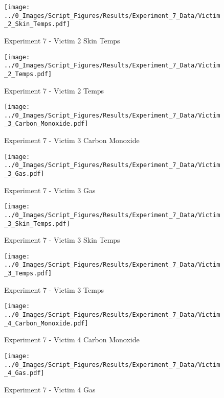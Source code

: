 	\clearpage

	\begin{figure}[H]
		\centering
		\texttt{[image: ../0\_Images/Script\_Figures/Results/Experiment\_7\_Data/Victim\_2\_Skin\_Temps.pdf]}
		\caption[]{Experiment 7 - Victim 2 Skin Temps}
	\end{figure}
 

	\begin{figure}[H]
		\centering
		\texttt{[image: ../0\_Images/Script\_Figures/Results/Experiment\_7\_Data/Victim\_2\_Temps.pdf]}
		\caption[]{Experiment 7 - Victim 2 Temps}
	\end{figure}
 
	\clearpage

	\begin{figure}[H]
		\centering
		\texttt{[image: ../0\_Images/Script\_Figures/Results/Experiment\_7\_Data/Victim\_3\_Carbon\_Monoxide.pdf]}
		\caption[]{Experiment 7 - Victim 3 Carbon Monoxide}
	\end{figure}
 

	\begin{figure}[H]
		\centering
		\texttt{[image: ../0\_Images/Script\_Figures/Results/Experiment\_7\_Data/Victim\_3\_Gas.pdf]}
		\caption[]{Experiment 7 - Victim 3 Gas}
	\end{figure}
 
	\clearpage

	\begin{figure}[H]
		\centering
		\texttt{[image: ../0\_Images/Script\_Figures/Results/Experiment\_7\_Data/Victim\_3\_Skin\_Temps.pdf]}
		\caption[]{Experiment 7 - Victim 3 Skin Temps}
	\end{figure}
 

	\begin{figure}[H]
		\centering
		\texttt{[image: ../0\_Images/Script\_Figures/Results/Experiment\_7\_Data/Victim\_3\_Temps.pdf]}
		\caption[]{Experiment 7 - Victim 3 Temps}
	\end{figure}
 
	\clearpage

	\begin{figure}[H]
		\centering
		\texttt{[image: ../0\_Images/Script\_Figures/Results/Experiment\_7\_Data/Victim\_4\_Carbon\_Monoxide.pdf]}
		\caption[]{Experiment 7 - Victim 4 Carbon Monoxide}
	\end{figure}
 

	\begin{figure}[H]
		\centering
		\texttt{[image: ../0\_Images/Script\_Figures/Results/Experiment\_7\_Data/Victim\_4\_Gas.pdf]}
		\caption[]{Experiment 7 - Victim 4 Gas}
	\end{figure}
 
